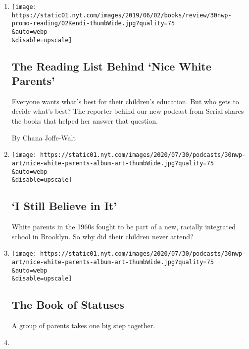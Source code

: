 \begin{enumerate}
\def\labelenumi{\arabic{enumi}.}
\item
  \href{/2020/07/30/podcasts/nice-white-parents-reading-list.html}{}

  \texttt{[image: https://static01.nyt.com/images/2019/06/02/books/review/30nwp-promo-reading/02Kendi-thumbWide.jpg?quality=75\\\&auto=webp\\\&disable=upscale]}

  \hypertarget{the-reading-list-behind-nice-white-parents}{%
  \subsection{The Reading List Behind `Nice White
  Parents'}\label{the-reading-list-behind-nice-white-parents}}

  Everyone wants what's best for their children's education. But who
  gets to decide what's best? The reporter behind our new podcast from
  Serial shares the books that helped her answer that question.

  By Chana Joffe-Walt
\item
  \href{/2020/07/30/podcasts/nice-white-parents-serial-2.html}{}

  \texttt{[image: https://static01.nyt.com/images/2020/07/30/podcasts/30nwp-art/nice-white-parents-album-art-thumbWide.jpg?quality=75\\\&auto=webp\\\&disable=upscale]}

  \hypertarget{i-still-believe-in-it}{%
  \subsection{`I Still Believe in It'}\label{i-still-believe-in-it}}

  White parents in the 1960s fought to be part of a new, racially
  integrated school in Brooklyn. So why did their children never attend?
\item
  \href{/2020/07/30/podcasts/nice-white-parents-serial.html}{}

  \texttt{[image: https://static01.nyt.com/images/2020/07/30/podcasts/30nwp-art/nice-white-parents-album-art-thumbWide.jpg?quality=75\\\&auto=webp\\\&disable=upscale]}

  \hypertarget{the-book-of-statuses}{%
  \subsection{The Book of Statuses}\label{the-book-of-statuses}}

  A group of parents takes one big step together.
\item
  \href{/2020/07/27/podcasts/the-daily/new-york-hospitals-covid.html}{}


\end{enumerate}
